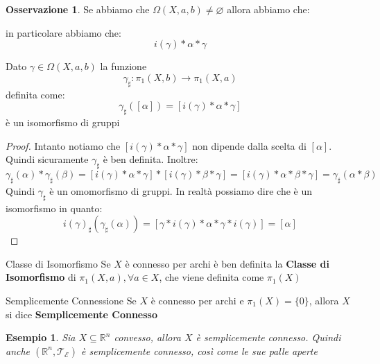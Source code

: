 \documentclass[11pt,a4paper,twoside]{article}
\newtheorem{es}{Esempio}
\theoremstyle{definition}
\newtheorem*{oss}{Osservazione}
\begin{document}
\begin{oss}
	Se abbiamo che $\Omega(X, a, b) \neq \varnothing$ allora abbiamo che:
	\begin{center}
	\end{center}
	in particolare abbiamo che:
	\[i (\gamma) * \alpha *\gamma\]
\end{oss}

\begin{prop}{}{}
	Dato $\gamma \in \Omega(X, a,b)$ la funzione
	\[ \gamma_{\sharp}:\pi_1(X, b) \to \pi_1(X, a)\]
	definita come:
	\[ \gamma_{\sharp}([\alpha]) = [i(\gamma)*\alpha*\gamma]\]
	è un isomorfismo di gruppi
\end{prop}
\begin{proof}
	Intanto notiamo che $[i(\gamma)*\alpha*\gamma]$ non dipende dalla scelta di $[\alpha]$. Quindi sicuramente $\gamma_\sharp$ è ben definita. Inoltre:
	\[ \gamma_\sharp(\alpha)*\gamma_\sharp(\beta) = [i(\gamma)*\alpha*\gamma]*[i(\gamma)*\beta*\gamma] = [i(\gamma)*\alpha*\beta*\gamma] = \gamma_\sharp(\alpha*\beta) \]
	Quindi $\gamma_\sharp$ è un omomorfismo di gruppi. In realtà possiamo dire che è un isomorfismo in quanto:
	\[ i(\gamma)_\sharp (\gamma_\sharp(\alpha)) = [\gamma*i(\gamma)*\alpha*\gamma*i(\gamma)] = [\alpha]\]
\end{proof}

\begin{defn}{Classe di Isomorfismo}{}
	Se $X$ è connesso per archi è ben definita la \textbf{Classe di Isomorfismo} di $\pi_1(X, a), \forall a \in X$, che viene definita come $\pi_1(X)$
\end{defn}

\begin{defn}{Semplicemente Connessione}{}
	Se $X$ è connesso per archi e $\pi_1(X) = \{0\}$, allora $X$ si dice \textbf{Semplicemente Connesso}
\end{defn}

\begin{es}
	Sia $X \subseteq \mathbb R^n$ convesso, allora $X$ è semplicemente connesso. Quindi anche $(\mathbb R^n, \mathcal T_\mathcal E)$ è semplicemente connesso, così come le sue palle aperte
\end{es}
\end{document}
